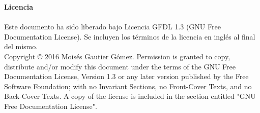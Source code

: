 {\huge \textbf{Licencia}}
\\
\\
\small{Este documento ha sido liberado bajo Licencia GFDL 1.3 (GNU Free Documentation License). Se incluyen los términos de la licencia en inglés al final del mismo.\\

Copyright \copyright{} 2016 Moisés Gautier Gómez. Permission is granted to copy, distribute and/or modify this document under the terms of the GNU Free Documentation License, Version 1.3 or any later version published by the Free Software Foundation; with no Invariant Sections, no Front-Cover Texts, and no Back-Cover Texts. A copy of the license is included in the section entitled "GNU Free Documentation License".\\}
